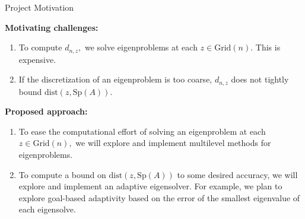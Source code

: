 \documentclass[aspectratio=169]{beamer}
\begin{document}
\begin{frame}{Project Motivation}

\textbf{Motivating challenges:}
\begin{enumerate}
    \item To compute $d_{n,z},$ we solve eigenproblems at each $z \in \text{Grid}(n).$ This is expensive.
    \vspace{0.5em}
    \item If the discretization of an eigenproblem is too coarse, $d_{n,z}$ does not tightly bound $\text{dist}(z, \text{Sp}(A)).$ 
\end{enumerate}

\vspace{1em}

\textbf{Proposed approach:}
\begin{enumerate}
    \item To ease the computational effort of solving an eigenproblem at each $z \in \text{Grid}(n),$ we will explore and implement multilevel methods for eigenproblems.
    \vspace{0.5em}
    \item To compute a bound on $\text{dist}(z, \text{Sp}(A))$ to some desired accuracy, we will explore and implement an adaptive eigensolver. For example,  we plan to explore goal-based adaptivity based on the error of the smallest eigenvalue of each eigensolve.
\end{enumerate}




\end{frame}
\end{document}
